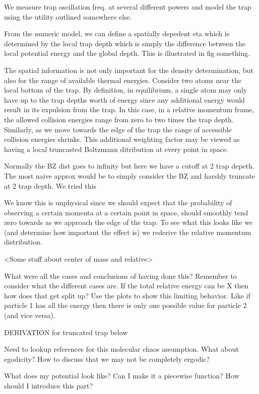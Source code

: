 We measure trap oscillation freq. at several different powers and model the trap using the utility outlined somewhere else.

From the numeric model, we can define a spatially depedent eta which is determined by the local trap depth which is simply the difference between the local potential energy and the global depth. This is illustrated in fig something.

The spatial information is not only important for the density determination, but also for the range of available thermal energies. Consider two atoms near the local bottom of the trap. By definition, in equilibrium, a single atom may only have up to the trap depths worth of energy since any additional energy would result in its expulsion from the trap. In this case, in a relative momentum frame, the allowed collision energies range from zero to two times the trap depth. Similarly, as we move towards the edge of the trap the range of accessible collision energies shrinks. This additional weighting factor may be viewed as having a local truncasted Boltzmann ditribution at every point in space. 

Normally the BZ dist goes to infinity but here we have a cutoff at 2 trap depeth. The most naive approx would be to simply consider the BZ and harshly truncate at 2 trap depth. We tried this

We know this is unphysical since we should expect that the probability of observing a certain momenta at a certain point in space, should smoothly tend zero towards as we approach the edge of the trap. To see what this looks like we (and determine how important the effect is) we rederive the relative momentum distribution.

<Some stuff about center of mass and relative>

What were all the cases and conclusions of having done this? Remember to consider what the different cases are. If the total relative energy can be X then how does that get split up? Use the plots to show this limiting behavior. Like if particle 1 has all the energy then there is only one possible value for particle 2 (and vice versa).


DERIVATION for truncated trap below

Need to lookup references for this molecular chaos assumption. What about egodicity? How to discuss that we may not be completely ergodic?

What does my potential look like? Can I make it a piecewise function? How should I introduce this part?

